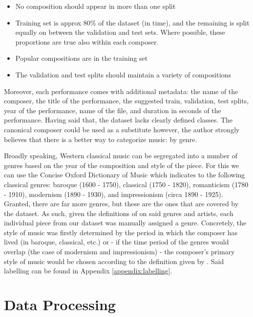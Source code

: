 \documentclass[a4paper]{book}
\begin{document}
\begin{itemize}
    \item No composition should appear in more than one split
    \item Training set is approx 80\% of the dataset (in time), and the remaining is split equally on between the validation and test sets. Where possible, these proportions are true also within each composer.
    \item Popular compositions are in the training set
    \item The validation and test splits should maintain a variety of compositions
\end{itemize}

Moreover, each performance comes with additional metadata: the name of the composer, the title of the performance, the suggested train, validation, test splits, year of the performance, name of the file, and duration in seconds of the performance. Having said that, the dataset lacks clearly defined classes. The canonical composer could be used as a substitute however, the author strongly believes that there is a better way to categorize music: by genre.

Broadly speaking, Western classical music can be segregated into a number of genres based on the year of the composition and style of the piece. For this we can use the Concise Oxford Dictionary of Music \parencite{kennedy_concise_2007} which indicates to the following classical genres: baroque (1600 - 1750), classical (1750 - 1820), romanticism (1780 - 1910), modernism (1890 - 1930), and impressionism (circa 1890 - 1925). Granted, there are far more genres, but these are the ones that are covered by the dataset. As such, given the definitions of \textcite{kennedy_concise_2007} on said genres and artists, each individual piece from our dataset was manually assigned a genre. Concretely, the style of music was firstly determined by the period in which the composer has lived (in baroque, classical, etc.) or - if the time period of the genres would overlap (the case of modernism and impressionism) - the composer's primary style of music would be chosen according to the definition given by \textcite{kennedy_concise_2007}. Said labelling can be found in Appendix \ref{appendix:labelling}.

\section{Data Processing} \label{sec:data_proc}
\end{document}

